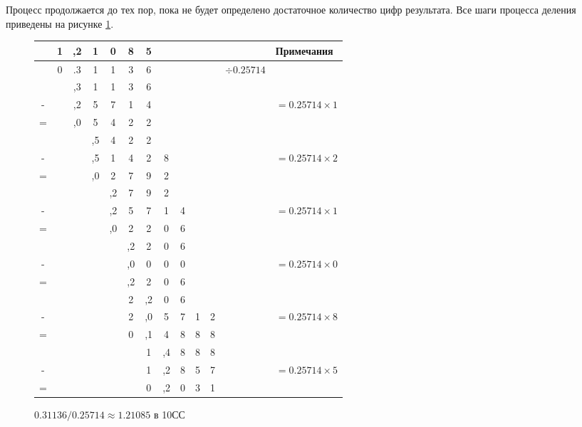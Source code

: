 Процесс продолжается до тех пор, пока не будет определено достаточное количество цифр результата. Все шаги процесса деления приведены на рисунке \ref{t:div:fpt:decimalDiv}.

\begin{figure}[!ht]
    \centering
    \begin{tabular}{ccccccccccc|cl}
           
          & 1 &,2 & 1 & 0 & 8 & 5 &   &   &   &   &                     & Примечания\\ 
          \hline\hline
          & 0 &.3 & 1 & 1 & 3 & 6 &   &   &   &   & ${\div 0.25714}$    &\\
          \hline\hline
          &   &,3 & 1 & 1 & 3 & 6 &   &   &   &   &                     &\\
        - &   &,2 & 5 & 7 & 1 & 4 &   &   &   &   &                     &$=0.25714\times 1$\\
        = &   &,0 & 5 & 4 & 2 & 2 &   &   &   &   &                     &\\ \hline
          &   &   &,5 & 4 & 2 & 2 &   &   &   &   &                     &\\ 
        - &   &   &,5 & 1 & 4 & 2 & 8 &   &   &   &                     &$=0.25714\times 2$\\
        = &   &   &,0 & 2 & 7 & 9 & 2 &   &   &   &                     &\\ \hline
          &   &   &   &,2 & 7 & 9 & 2 &   &   &   &                     &\\ 
        - &   &   &   &,2 & 5 & 7 & 1 & 4 &   &   &                     &$=0.25714\times 1$\\
        = &   &   &   &,0 & 2 & 2 & 0 & 6 &   &   &                     &\\ \hline
          &   &   &   &   &,2 & 2 & 0 & 6 &   &   &                     &\\ 
        - &   &   &   &   &,0 & 0 & 0 & 0 &   &   &                     &$=0.25714\times 0$\\
        = &   &   &   &   &,2 & 2 & 0 & 6 &   &   &                     &\\ \hline
          &   &   &   &   & 2 &,2 & 0 & 6 &   &   &                     &\\ 
        - &   &   &   &   & 2 &,0 & 5 & 7 & 1 & 2 &                     &$=0.25714\times 8$\\
        = &   &   &   &   & 0 &,1 & 4 & 8 & 8 & 8 &                     &\\ \hline
          &   &   &   &   &   & 1 &,4 & 8 & 8 & 8 &                     &\\ 
        - &   &   &   &   &   & 1 &,2 & 8 & 5 & 7 &                     &$=0.25714\times 5$\\
        = &   &   &   &   &   & 0 &,2 & 0 & 3 & 1 &                     &\\ \hline
    \end{tabular}
	
    \caption{$0.31136/0.25714 \approx 1.21085$ в 10СС}
    \label{t:div:fpt:decimalDiv}
\end{figure}

